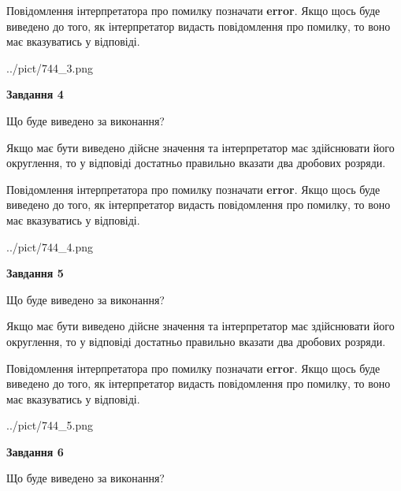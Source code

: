 \documentclass[12pt, ukrainian]{article}
\begin{document}
{\begin {Large}
Повідомлення інтерпретатора про помилку позначати \textbf{error}.
Якщо щось буде виведено до того, як інтерпретатор видасть повідомлення про помилку, 
то воно має вказуватись у відповіді. \par

\begin{center}
	{../pict/744_3.png}
\end{center}
\newpage

{\begin {center}\textbf{Завдання 4}\end {center}}\par
Що буде виведено за виконання? \par

Якщо має бути виведено дійсне значення та інтерпретатор має здійснювати його округлення, 
то у відповіді достатньо правильно вказати два дробових розряди.

Повідомлення інтерпретатора про помилку позначати \textbf{error}.
Якщо щось буде виведено до того, як інтерпретатор видасть повідомлення про помилку, 
то воно має вказуватись у відповіді. \par

\begin{center}
	{../pict/744_4.png}
\end{center}
\newpage

{\begin {center}\textbf{Завдання 5}\end {center}}\par
Що буде виведено за виконання? \par

Якщо має бути виведено дійсне значення та інтерпретатор має здійснювати його округлення, 
то у відповіді достатньо правильно вказати два дробових розряди.

Повідомлення інтерпретатора про помилку позначати \textbf{error}.
Якщо щось буде виведено до того, як інтерпретатор видасть повідомлення про помилку, 
то воно має вказуватись у відповіді. \par

\begin{center}
	{../pict/744_5.png}
\end{center}
\newpage

{\begin {center}\textbf{Завдання 6}\end {center}}\par
Що буде виведено за виконання? \par


\end{Large}}
\end{document}
